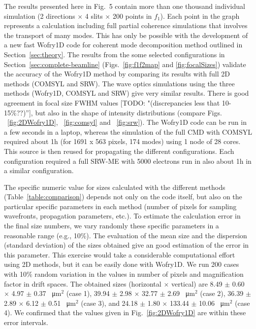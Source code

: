 \documentclass{iucr}              %
\newcommand{\todo}[1]{{\color{red}[TODO: "#1'']}}
\begin{document}
The results presented here in Fig.~5 contain more than one thousand individual simulation (2 directions $\times$ 4 slits $\times$ 200 points in $f_1$). Each point in the graph represents a calculation including full partial coherence simulations that involves the transport of many modes. This has only be possible with the development of a new fast Wofry1D code for coherent mode decomposition method outlined in Section~\ref{sec:theory}. The results from the some selected configurations in Section~\ref{sec:complete-beamline} (Figs.~\ref{fig:f1f2map} and \ref{fig:focalSizes}) validate the accuracy of the Wofry1D method by comparing its results with full 2D methods (COMSYL and SRW). The wave optics simulations using the three methods (Wofry1D, COMSYL and SRW) give very similar results. 
There is good agreement in focal size FWHM values \todo{(discrepancies less that 10-15\%??)}, but also in the shape of intensity distributions (compare Figs. ~\ref{fig:2DWofry1D}, ~\ref{fig:comsyl} and ~\ref{fig:srw}). The Wofry1D code can be run in a few seconds in a laptop, whereas the simulation of the full CMD with COMSYL required about 1h (for 1691 x 563 pixels, 174 modes) using 1 node of 28 cores. This source is then reused for propagating the different configurations. Each configuration required a full SRW-ME with 5000 electrons run in also about 1h in a similar configuration. 

The specific numeric value for sizes calculated with the different methods (Table~\ref{table:comparison}) depends not only on the code itself, but also on the particular specific parameters in each method (number of pixels for sampling wavefronts, propagation parameters, etc.). To estimate the calculation error in the final size numbers, we vary randomly these specific parameters in a reasonable range (e.g., 10\%). The evaluation of the mean size and the dispersion (standard deviation) of the sizes obtained give an good estimation of the error in this parameter. This exercise would take a considerable computational effort using 2D methods, but it can be easily done with Wofry1D. We run 200 cases with 10\% random variation in the values in number of pixels and magnification factor in drift spaces. The obtained sizes (horizontal $\times$ vertical) are  
8.49 $\pm$ 0.60 $\times$ 4.97 $\pm$ 0.37 \SI{}{\micro\meter}$^2$ (case 1),
39.94 $\pm$ 2.98 $\times$ 32.77 $\pm$ 2.69 \SI{}{\micro\meter}$^2$ (case 2),
36.39 $\pm$ 2.89 $\times$ 6.12 $\pm$ 0.51 \SI{}{\micro\meter}$^2$ (case 3), and
24.18 $\pm$ 1.80 $\times$ 133.44 $\pm$ 10.06 \SI{}{\micro\meter}$^2$ (case 4). We confirmed that the values given in Fig.~\ref{fig:2DWofry1D} are within these error intervals.
\end{document}

